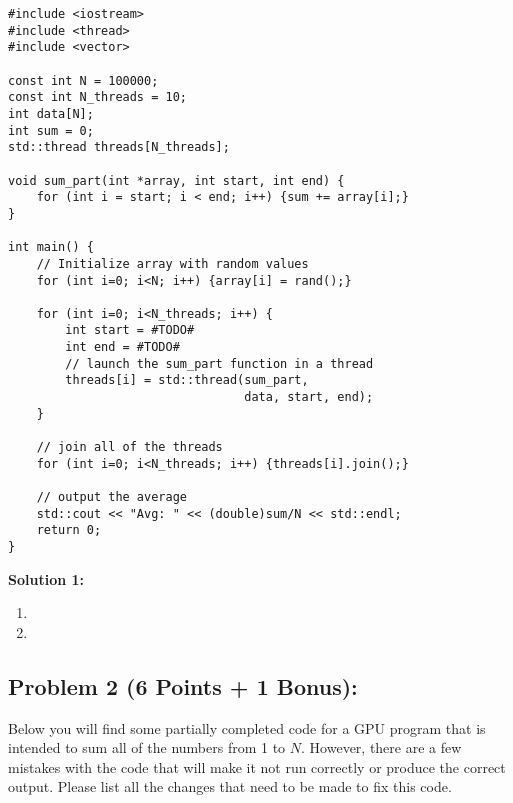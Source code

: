\documentclass[]{article}
\begin{document}
\begin{lstlisting}
#include <iostream>
#include <thread>
#include <vector>

const int N = 100000;
const int N_threads = 10;
int data[N];
int sum = 0;
std::thread threads[N_threads];

void sum_part(int *array, int start, int end) {
    for (int i = start; i < end; i++) {sum += array[i];}
}

int main() {
    // Initialize array with random values
    for (int i=0; i<N; i++) {array[i] = rand();}

    for (int i=0; i<N_threads; i++) {
        int start = #TODO#
        int end = #TODO#
        // launch the sum_part function in a thread
        threads[i] = std::thread(sum_part, 
                                 data, start, end);
    }

    // join all of the threads
    for (int i=0; i<N_threads; i++) {threads[i].join();}

    // output the average
    std::cout << "Avg: " << (double)sum/N << std::endl;
    return 0;
}
\end{lstlisting}

\textbf{Solution 1:}
\begin{enumerate}[label=(\alph*)]
    \item %
    \item %
\end{enumerate}



\clearpage
\subsection*{Problem 2 (6 Points + 1 Bonus):}
Below you will find some partially completed code for a GPU program that is intended to sum all of the numbers from 1 to $N$. However, there are a few mistakes with the code that will make it not run correctly or produce the correct output. Please list all the changes that need to be made to fix this code.
\end{document}
